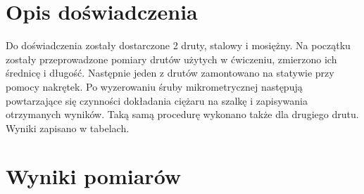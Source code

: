 \documentclass[a4paper,10pt,twoside]{article}
\begin{document}
\section{Opis doświadczenia}
Do doświadczenia zostały dostarczone 2 druty, stalowy i mosiężny. Na początku zostały przeprowadzone pomiary drutów użytych w ćwiczeniu,
zmierzono ich średnicę i długość. Następnie jeden z drutów zamontowano na statywie przy pomocy nakrętek. Po wyzerowaniu śruby mikrometrycznej
następują powtarzające się czynności dokładania ciężaru na szalkę i zapisywania otrzymanych wyników. Taką samą procedurę wykonano także dla drugiego
drutu. Wyniki zapisano w tabelach.

\newpage
\section{Wyniki pomiarów}
\end{document}
